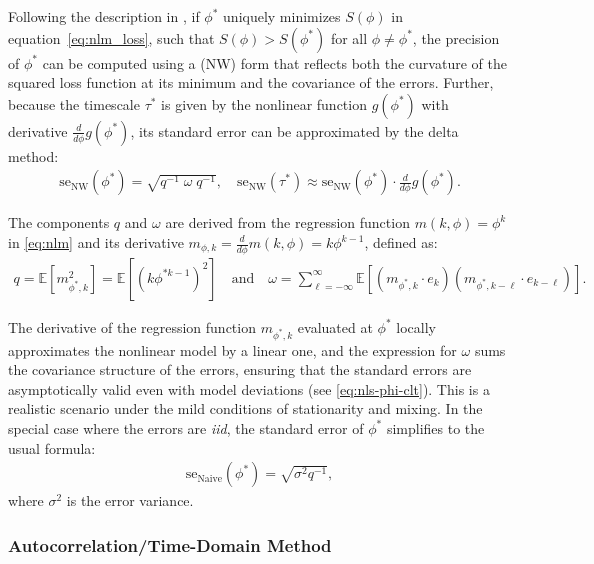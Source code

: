 \documentclass[docs/main.tex]{subfiles}
\begin{document}
Following the description in \citet[Chapter~22.8 and Chapter~23.5]{hansen_econometrics_2022}, if $\phi^*$ uniquely minimizes $S(\phi)$ in equation~\eqref{eq:nlm_loss}, such that $S(\phi) > S(\phi^*)$ for all $\phi \neq \phi^*$, the precision of $\phi^*$ can be computed using a \citet{newey_simple_1987} (NW) form that reflects both the curvature of the squared loss function at its minimum and the covariance of the errors. Further, because the timescale $\tau^*$ is given by the nonlinear function $g(\phi^*)$ with derivative $\frac{d}{d\phi} g(\phi^*)$, its standard error can be approximated by the delta method:
\begin{align}\label{eq:stderr-autocorrelation-domain}
    \text{se}_\text{NW}(\phi^*) = \sqrt{q^{-1}\; \omega \;q^{-1}}, \quad \text{se}_\text{NW}(\tau^*) \approx \text{se}_\text{NW}(\phi^*) \cdot \frac{d}{d\phi}g(\phi^*).
\end{align}

\noindent The components $q$ and $\omega$ are derived from the regression function $m(k, \phi) = \phi^k$ in \eqref{eq:nlm} and its derivative $m_{\phi, k} = \frac{d}{d\phi} m(k, \phi) = k \phi^{k-1}$, defined as:
\begin{align}
    q = \mathbb{E}[m_{\phi^*, k}^2] = \mathbb{E}[(k \phi^{*k-1})^2] \quad\text{and}\quad
    \omega = \sum_{\ell=-\infty}^{\infty} \mathbb{E}[(m_{\phi^*, k} \cdot e_{k})(m_{\phi^*, k-\ell} \cdot e_{k-\ell})].
\end{align}

\noindent The derivative of the regression function $m_{\phi^*, k}$ evaluated at $\phi^*$ locally approximates the nonlinear model by a linear one, and the expression for $\omega$ sums the covariance structure of the errors, ensuring that the standard errors are asymptotically valid even with model deviations (see \eqref{eq:nls-phi-clt}). This is a realistic scenario under the mild conditions of stationarity and mixing. In the special case where the errors are \textit{iid}, the standard error of $\phi^*$ simplifies to the usual formula:
\begin{align}
    \text{se}_{\text{Naive}}(\phi^*) = \sqrt{\sigma^2 q^{-1}},
\end{align}
\noindent where $\sigma^2$ is the error variance.

\subsubsection{Autocorrelation/Time-Domain Method}
\end{document}

